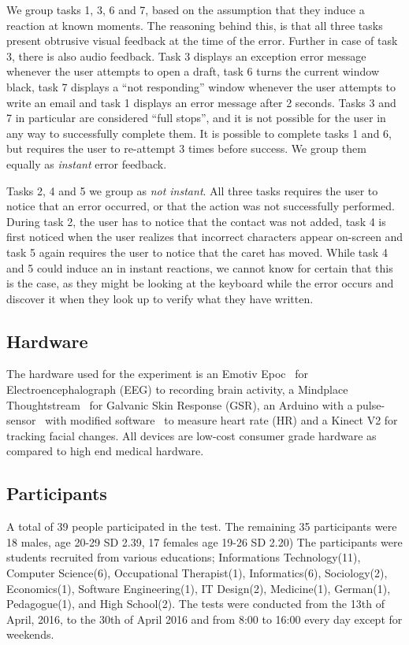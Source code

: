 We group tasks 1, 3, 6 and 7, based on the assumption that they induce a reaction at known moments. The reasoning behind this, is that all three tasks present obtrusive visual feedback at the time of the error. Further in case of task 3, there is also audio
feedback. Task 3 displays an exception error message whenever the user attempts to open a draft, task 6 turns the
current window
black, task 7 displays a ``not responding'' window whenever the user attempts to write an email and task 1 displays an
error message after 2 seconds. Tasks 3 and 7 in particular are considered ``full stops'', and it is not possible for the
user in any way to successfully complete them. It is possible to complete tasks 1 and 6, but requires the user to
re-attempt 3 times before success. We group them equally as \textit{instant} error feedback.

Tasks 2, 4 and 5 we group as \textit{not instant}. All three tasks requires the user to notice that an error occurred, or
that the action was not successfully performed. During task 2, the user has to notice that the contact was not added,
task 4 is first noticed when the user realizes that incorrect characters appear on-screen and task 5 again requires the
user to notice that the caret has moved. While task 4 and 5 could induce an in instant reactions, we cannot know for
certain that this is the case, as they might be looking at the keyboard while the error occurs and discover it when they look up to verify what they have written.

\subsection{Hardware}
The hardware used for the experiment is an Emotiv Epoc~\cite{emotiv_epoc_website} for Electroencephalograph (EEG) to recording brain activity, a Mindplace Thoughtstream~\cite{thoughtstream} for Galvanic Skin Response (GSR), an Arduino with a pulse-sensor~\cite{pulsesensor} with modified software~\cite{pulsesensorgit} to measure heart rate (HR) and a Kinect V2\cite{kinect_specs3} for tracking facial changes.
All devices are low-cost consumer grade hardware as compared to high end medical hardware.

\subsection{Participants}
A total of 39 people participated in the test.
The remaining 35 participants were 18 males, age 20-29 SD 2.39, 17 females age 19-26 SD 2.20)
The participants were students recruited from various educations; Informations Technology(11), Computer Science(6), Occupational Therapist(1), Informatics(6), Sociology(2), Economics(1), Software Engineering(1), IT Design(2), Medicine(1), German(1), Pedagogue(1), and High School(2).
The tests were conducted from the 13th of April, 2016, to the 30th of April 2016 and from 8:00 to 16:00 every day except for weekends. 

